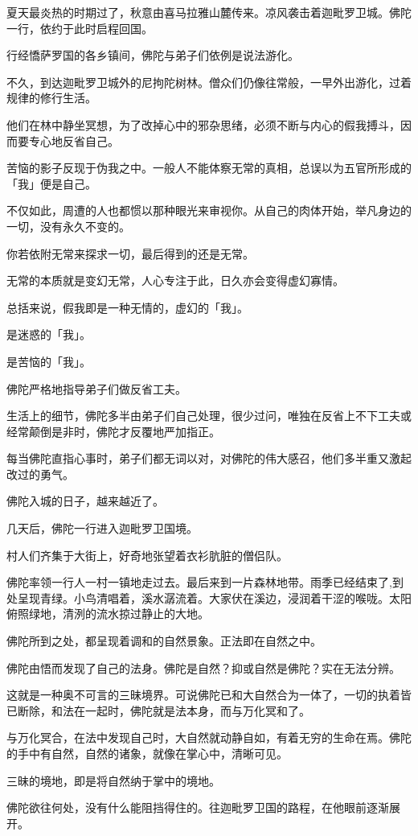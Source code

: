 \documentclass[twoside,openany]{book}
\begin{document}
夏天最炎热的时期过了，秋意由喜马拉雅山麓传来。凉风袭击着迦毗罗卫城。佛陀一行，依约于此时启程回国。

行经憍萨罗国的各乡镇间，佛陀与弟子们依例是说法游化。

不久，到达迦毗罗卫城外的尼拘陀树林。僧众们仍像往常般，一早外出游化，过着规律的修行生活。

他们在林中静坐冥想，为了改掉心中的邪杂思绪，必须不断与内心的假我搏斗，因而要专心地反省自己。

苦恼的影子反现于伪我之中。一般人不能体察无常的真相，总误以为五官所形成的「我」便是自己。

不仅如此，周遭的人也都惯以那种眼光来审视你。从自己的肉体开始，举凡身边的一切，没有永久不变的。

你若依附无常来探求一切，最后得到的还是无常。

无常的本质就是变幻无常，人心专注于此，日久亦会变得虚幻寡情。

总括来说，假我即是一种无情的，虚幻的「我」。

是迷惑的「我」。

是苦恼的「我」。

佛陀严格地指导弟子们做反省工夫。

生活上的细节，佛陀多半由弟子们自己处理，很少过问，唯独在反省上不下工夫或经常颠倒是非时，佛陀才反覆地严加指正。

每当佛陀直指心事时，弟子们都无词以对，对佛陀的伟大感召，他们多半重又激起改过的勇气。

佛陀入城的日子，越来越近了。

几天后，佛陀一行进入迦毗罗卫国境。

村人们齐集于大街上，好奇地张望着衣衫肮脏的僧侣队。

佛陀率领一行人一村一镇地走过去。最后来到一片森林地带。雨季已经结束了,到处呈现青绿。小鸟清唱着，溪水潺流着。大家伏在溪边，浸润着干涩的喉咙。太阳俯照绿地，清洌的流水掠过静止的大地。

佛陀所到之处，都呈现着调和的自然景象。正法即在自然之中。

佛陀由悟而发现了自己的法身。佛陀是自然？抑或自然是佛陀？实在无法分辨。

这就是一种奥不可言的三昧境界。可说佛陀已和大自然合为一体了，一切的执着皆已断除，和法在一起时，佛陀就是法本身，而与万化冥和了。

与万化冥合，在法中发现自己时，大自然就动静自如，有着无穷的生命在焉。佛陀的手中有自然，自然的诸象，就像在掌心中，清晰可见。

三昧的境地，即是将自然纳于掌中的境地。

佛陀欲往何处，没有什么能阻挡得住的。往迦毗罗卫国的路程，在他眼前逐渐展开。
\end{document}
